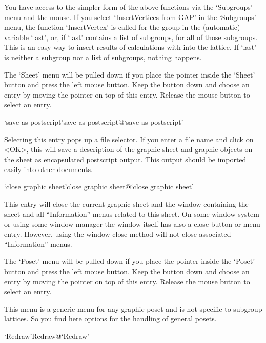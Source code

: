 You have access to the simpler form of the above functions via the
`Subgroups' menu and the mouse. If you select 
`InsertVertices from GAP'
in the `Subgroups' menu, the function `InsertVertex' is called 
for the group in the (automatic) variable `last', or, if `last'
contains a list of subgroups, for all of those subgroups. This is an
easy way to insert results of calculations with {\GAP} into the
lattice. If `last' is neither a subgroup nor a list of subgroups,
nothing happens.



The `Sheet' menu will  be pulled down if  you place the pointer inside  the
`Sheet' button  and press the left mouse  button.  Keep the button down and
choose an entry by moving the pointer on  top of this entry.  Release the
mouse button to select an entry.

\>`save as postscript'{save as postscript}@{`save as postscript'}

Selecting this entry pops up a file  selector.  If you  enter a file name
and click on <OK>, this will save a  description of the graphic sheet and
graphic objects on  the sheet as encapsulated postscript  output. This
output should be imported easily into other documents.

\>`close graphic sheet'{close graphic sheet}@{`close graphic sheet'}

This entry will close the current graphic sheet and the window containing
the sheet  and all  ``Information'' menus related  to  this sheet.  On some
window system or using  some window manager the window  itself has also a
close button or menu entry.  However,  using the window close method will
not close associated ``Information'' menus.



The `Poset' menu will be pulled down if you place the pointer inside the
`Poset' button and  press the left mouse  button.  Keep  the button down
and choose an entry by moving the pointer on top of  this entry.  Release
the mouse button to select an entry.

This menu is a generic menu for any graphic poset and is not specific to
subgroup lattices. So you find here options for the handling of general
posets. 

\>`Redraw'{Redraw}@{`Redraw'}

